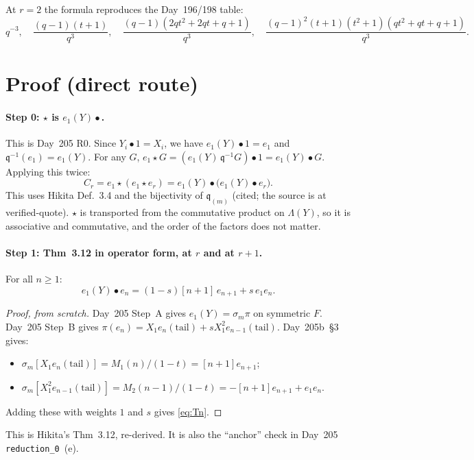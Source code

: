 \documentclass[11pt]{amsart}
\theoremstyle{remark}
\newcommand{\tn}[1]{[#1]}
\newcommand{\qq}{\mathfrak{q}}
\newcommand{\st}{\star}
\begin{document}
At $r=2$ the formula reproduces the Day~196/198 table:
\[
q^{-3},\quad \frac{(q-1)(t+1)}{q^3},\quad \frac{(q-1)(2qt^2+2qt+q+1)}{q^3},\quad \frac{(q-1)^2(t+1)(t^2+1)(qt^2+qt+q+1)}{q^3}.
\]

\section{Proof (direct route)}\label{sec:proof}

\paragraph{Step 0: $\st$ is $e_1(Y)\bullet$.} This is Day~205 R0. Since $Y_i\bullet1=X_i$, we have $e_1(Y)\bullet1=e_1$ and $\qq^{-1}(e_1)=e_1(Y)$. For any $G$, $e_1\st G=(e_1(Y)\,\qq^{-1}G)\bullet1=e_1(Y)\bullet G$. Applying this twice:
\[
C_r = e_1\st(e_1\st e_r) = e_1(Y)\bullet\bigl(e_1(Y)\bullet e_r\bigr).
\]
This uses Hikita Def.~3.4 and the bijectivity of $\qq_{(m)}$ (cited; the source is at verified-quote). $\st$ is transported from the commutative product on $\Lambda(Y)$, so it is associative and commutative, and the order of the factors does not matter.

\paragraph{Step 1: Thm~3.12 in operator form, at $r$ and at $r+1$.} For all $n\ge1$:
\begin{equation}\label{eq:Tn}\tag{$T_n$}
e_1(Y)\bullet e_n = (1-s)\tn{n+1}\,e_{n+1} + s\,e_1e_n.
\end{equation}

\begin{proof}[Proof, from scratch]
Day~205 Step~A gives $e_1(Y)=\sigma_m\pi$ on symmetric $F$. Day~205 Step~B gives $\pi(e_n)=X_1e_n(\mathrm{tail})+sX_1^2e_{n-1}(\mathrm{tail})$. Day~205b~\S3 gives:
\begin{itemize}
\item $\sigma_m[X_1e_n(\mathrm{tail})]=M_1(n)/(1-t)=\tn{n+1}e_{n+1}$;
\item $\sigma_m[X_1^2e_{n-1}(\mathrm{tail})]=M_2(n-1)/(1-t)=-\tn{n+1}e_{n+1}+e_1e_n$.
\end{itemize}
Adding these with weights $1$ and $s$ gives \eqref{eq:Tn}.
\end{proof}

This is Hikita's Thm~3.12, re-derived. It is also the ``anchor'' check in Day~205 \texttt{reduction\_0}~(e).
\end{document}
